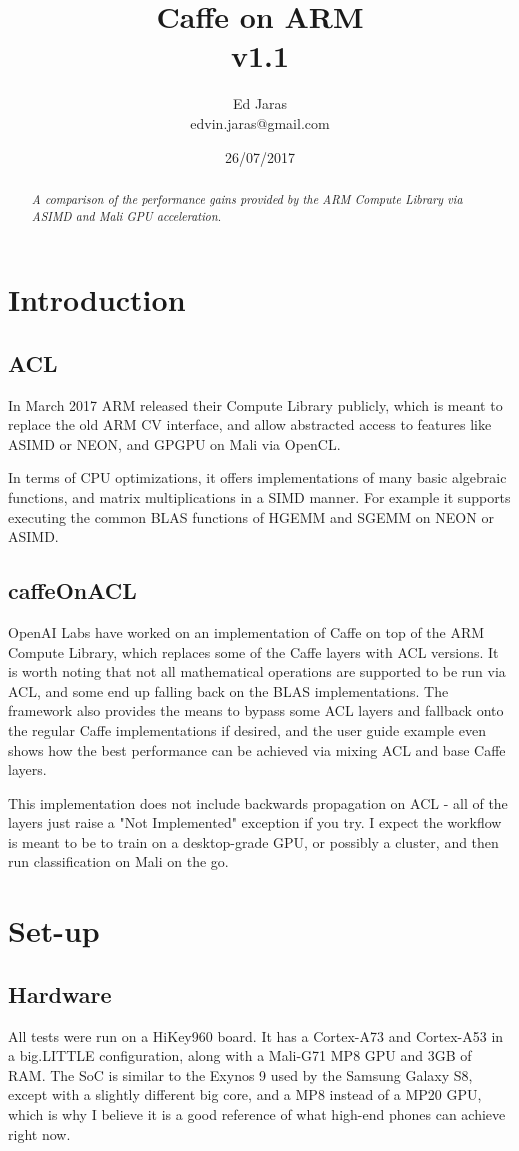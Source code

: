 \documentclass[12pt, a4paper, notitlepage]{report}
\title{Caffe on ARM \\ v1.1}
\author{Ed Jaras \\edvin.jaras@gmail.com}
\date{26/07/2017}
\begin{document}
\maketitle
\thispagestyle{empty}
\begin{abstract}
\textit{A comparison of the performance gains provided by the ARM Compute Library via ASIMD and Mali GPU acceleration.}
\end{abstract}
\section*{Introduction}
\subsection*{ACL}
In March 2017 ARM released their Compute Library publicly, which is meant to replace the old ARM CV interface, and allow abstracted access to features like ASIMD or NEON, and GPGPU on Mali via OpenCL.\cite{acl_post}

In terms of CPU optimizations, it offers implementations of many basic algebraic functions, and matrix multiplications in a SIMD manner. For example it supports executing the common BLAS functions of HGEMM and SGEMM on NEON or ASIMD.

\subsection*{caffeOnACL}
OpenAI Labs have worked on an implementation of Caffe on top of the ARM Compute Library, which replaces some of the Caffe layers with ACL versions. It is worth noting that not all mathematical operations are supported to be run via ACL, and some end up falling back on the BLAS implementations. The framework also provides the means to bypass some ACL layers and fallback onto the regular Caffe implementations if desired, and the user guide example even shows how the best performance can be achieved via mixing ACL and base Caffe layers.\cite{coacl}

This implementation does not include backwards propagation on ACL - all of the layers just raise a "Not Implemented" exception if you try. I expect the workflow is meant to be to train on a desktop-grade GPU, or possibly a cluster, and then run classification on Mali on the go.

\section*{Set-up}
\subsection*{Hardware}
All tests were run on a HiKey960 board. It has a Cortex-A73 and Cortex-A53 in a big.LITTLE configuration, along with a Mali-G71 MP8 GPU and 3GB of RAM. The SoC is similar to the Exynos 9 used by the Samsung Galaxy S8, except with a slightly different big core, and a MP8 instead of a MP20 GPU, which is why I believe it is a good reference of what high-end phones can achieve right now.\cite{galaxy}
\end{document}

